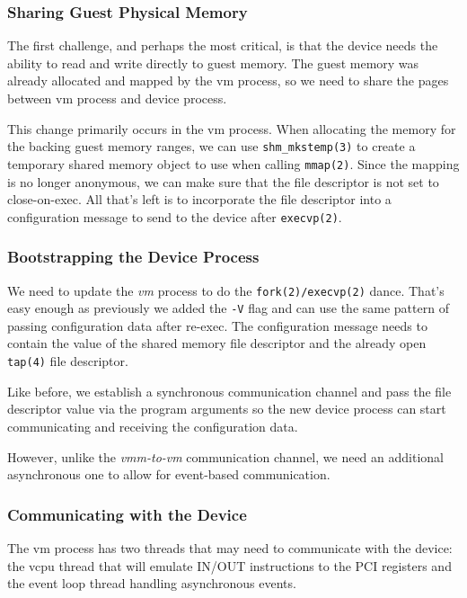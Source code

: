 \documentclass[conference]{IEEEtran}
\begin{document}
\vspace{2mm}
\subsubsection{Sharing Guest Physical Memory}
The first challenge, and perhaps the most critical, is that the device
needs the ability to read and write directly to guest memory. The
guest memory was already allocated and mapped by the vm process, so we
need to share the pages between vm process and device process.

This change primarily occurs in the vm process. When allocating the
memory for the backing guest memory ranges, we can use
\texttt{shm\_mkstemp(3)} to create a temporary shared memory object
to use when calling \texttt{mmap(2)}. Since the mapping is no longer
anonymous, we can make sure that the file descriptor is not set to
close-on-exec. All that's left is to incorporate the file descriptor
into a configuration message to send to the device after
\texttt{execvp(2)}.


\vspace{2mm}
\subsubsection{Bootstrapping the Device Process}
We need to update the \emph{vm} process to do the
\texttt{fork(2)/execvp(2)} dance. That's easy enough as previously we
added the \texttt{-V} flag and can use the same pattern of passing
configuration data after re-exec. The configuration message needs to
contain the value of the shared memory file descriptor and the already
open \texttt{tap(4)} file descriptor.

Like before, we establish a synchronous communication channel and pass
the file descriptor value via the program arguments so the new device
process can start communicating and receiving the configuration data.

However, unlike the \emph{vmm-to-vm} communication channel, we need an
additional asynchronous one to allow for event-based communication.


\vspace{2mm}
\subsubsection{Communicating with the Device}
The vm process has two threads that may need to communicate with the
device: the vcpu thread that will emulate IN/OUT instructions to the
PCI registers and the event loop thread handling asynchronous events.
\end{document}
